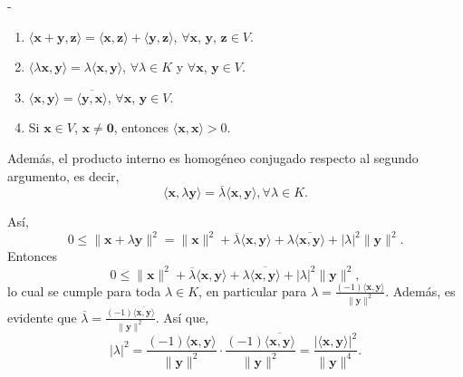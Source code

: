 \begin{theorem}
\begin{adjustwidth}{0mm}{-\wholeMargin}
\begin{minipage}[c]{7.7cm}
{{            \begin{enumerate}[label=\roman*)]
                \item $\langle \mathbf{x} + \mathbf{y}, \mathbf{z} \rangle = \langle \mathbf{x}, \mathbf{z} \rangle + \langle \mathbf{y}, \mathbf{z} \rangle$, $\forall \mathbf{x}$, $\mathbf{y}$, $\mathbf{z} \in V$.
                \item $\langle \lambda \mathbf{x}, \mathbf{y} \rangle = \lambda \langle \mathbf{x}, \mathbf{y} \rangle$, $\forall \lambda \in K$ y $\forall \mathbf{x}$, $\mathbf{y} \in V$.
                \item $\langle \mathbf{x}, \mathbf{y} \rangle = \overline{\langle \mathbf{y}, \mathbf{x} \rangle}$, $\forall \mathbf{x}$, $\mathbf{y} \in V$.
                \item Si $\mathbf{x} \in V$, $\mathbf{x} \neq \mathbf{0}$, entonces $\langle \mathbf{x}, \mathbf{x} \rangle > 0$.\\[-2mm]
            \end{enumerate}
            Además, el producto interno es homogéneo conjugado respecto al segundo argumento, es decir,
            $$\langle \mathbf{x}, \lambda \mathbf{y} \rangle = \overline{\lambda} \langle \mathbf{x}, \mathbf{y} \rangle , \forall \lambda \in K.$$
        }}
        \end{minipage}
    \end{adjustwidth}\vspace{-0.3cm}
    Así,
    $$0 \leq \| \mathbf{x} + \lambda \mathbf{y} \|^2 = \| \mathbf{x} \|^2 + \overline{\lambda} \langle \mathbf{x}, \mathbf{y} \rangle + \lambda \overline{\langle \mathbf{x}, \mathbf{y} \rangle} + |\lambda|^2 \| \mathbf{y} \|^2.$$
    Entonces
    \begin{equation}
        0 \leq \| \mathbf{x} \|^2 + \overline{\lambda} \langle \mathbf{x}, \mathbf{y} \rangle + \lambda \overline{\langle \mathbf{x}, \mathbf{y} \rangle} + |\lambda|^2 \| \mathbf{y} \|^2, \label{desigualdad-cauchy}
    \end{equation}
    lo cual se cumple para toda $\lambda \in K$, en particular para $\displaystyle \lambda = \frac{(-1)\langle \mathbf{x}, \mathbf{y} \rangle}{\| \mathbf{y} \|^2}$. Además, es evidente que $\displaystyle \overline{\lambda} = \frac{(-1)\overline{\langle \mathbf{x}, \mathbf{y} \rangle}}{\| \mathbf{y} \|^2}$. Así que,
    $$|\lambda|^2 = \frac{(-1)\langle \mathbf{x}, \mathbf{y} \rangle}{\| \mathbf{y} \|^2} \cdot \frac{(-1)\overline{\langle \mathbf{x}, \mathbf{y} \rangle}}{\| \mathbf{y} \|^2} = \frac{|\langle \mathbf{x}, \mathbf{y} \rangle|^2}{\| \mathbf{y} \|^4}.$$

\end{theorem}
